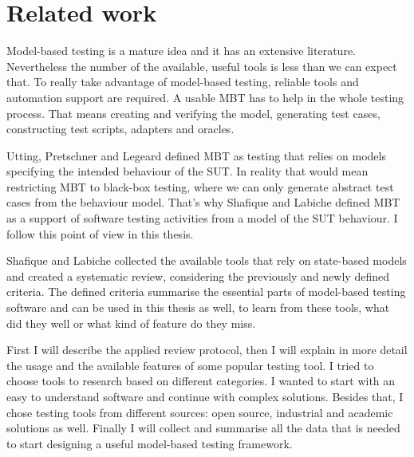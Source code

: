 \chapter{Related work}
\label{cha:relatedwork}

Model-based testing is a mature idea and it has an extensive literature. Nevertheless the number of the available, useful tools is less than we can expect that. To really take advantage of model-based testing, reliable tools and automation support are required. A usable MBT has to help in the whole testing process. That means creating and verifying the model, generating test cases, constructing test scripts, adapters and oracles.

Utting, Pretschner and Legeard \cite{taxonomy} defined MBT as testing that relies on models specifying the intended behaviour of the SUT. In reality that would mean restricting MBT to black-box testing, where we can only generate abstract test cases from the behaviour model. That's why Shafique and Labiche defined MBT as a support of software testing activities from a model of the SUT behaviour. I follow this point of view in this thesis.

Shafique and Labiche \cite{toolsreview} collected the available tools that rely on state-based models and created a systematic review, considering the previously and newly defined criteria. The defined criteria summarise the essential parts of model-based testing software and can be used in this thesis as well, to learn from these tools, what did they well or what kind of feature do they miss.

First I will describe the applied review protocol, then I will explain in more detail the usage and the available features of some popular testing tool. I tried to choose tools to research based on different categories. I wanted to start with an easy to understand software and continue with complex solutions. Besides that, I chose testing tools from different sources: open source, industrial and academic solutions as well. Finally I will collect and summarise all the data that is needed to start designing a useful model-based testing framework.

